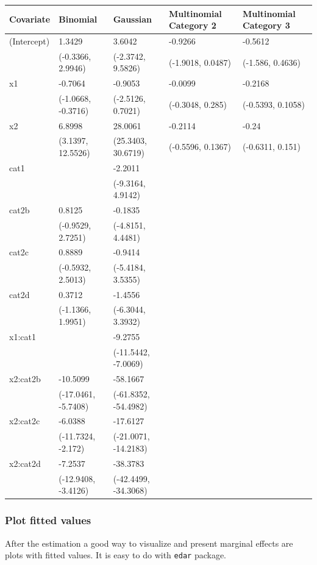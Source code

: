 \documentclass[a4paper]{article}
\begin{document}
\begin{center}
\begin{tabular}{lllll}
Covariate & Binomial & Gaussian & Multinomial Category 2 & Multinomial Category 3\\
\hline
(Intercept) & 1.3429 & 3.6042 & -0.9266 & -0.5612\\
 & (-0.3366, 2.9946) & (-2.3742, 9.5826) & (-1.9018, 0.0487) & (-1.586, 0.4636)\\
x1 & -0.7064 & -0.9053 & -0.0099 & -0.2168\\
 & (-1.0668, -0.3716) & (-2.5126, 0.7021) & (-0.3048, 0.285) & (-0.5393, 0.1058)\\
x2 & 6.8998 & 28.0061 & -0.2114 & -0.24\\
 & (3.1397, 12.5526) & (25.3403, 30.6719) & (-0.5596, 0.1367) & (-0.6311, 0.151)\\
cat1 &  & -2.2011 &  & \\
 &  & (-9.3164, 4.9142) &  & \\
cat2b & 0.8125 & -0.1835 &  & \\
 & (-0.9529, 2.7251) & (-4.8151, 4.4481) &  & \\
cat2c & 0.8889 & -0.9414 &  & \\
 & (-0.5932, 2.5013) & (-5.4184, 3.5355) &  & \\
cat2d & 0.3712 & -1.4556 &  & \\
 & (-1.1366, 1.9951) & (-6.3044, 3.3932) &  & \\
x1:cat1 &  & -9.2755 &  & \\
 &  & (-11.5442, -7.0069) &  & \\
x2:cat2b & -10.5099 & -58.1667 &  & \\
 & (-17.0461, -5.7408) & (-61.8352, -54.4982) &  & \\
x2:cat2c & -6.0388 & -17.6127 &  & \\
 & (-11.7324, -2.172) & (-21.0071, -14.2183) &  & \\
x2:cat2d & -7.2537 & -38.3783 &  & \\
 & (-12.9408, -3.4126) & (-42.4499, -34.3068) &  & \\
\end{tabular}
\end{center}
\subsubsection{Plot fitted values}
\label{sec:org21023eb}

After the estimation a good way to visualize and present marginal effects are plots with fitted values. It is easy to do with \texttt{edar} package.
\end{document}
